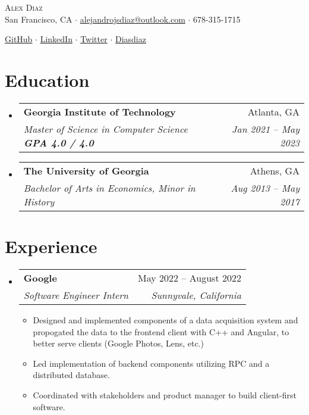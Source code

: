 \documentclass[12pt, letter]{article}
\makeatletter
\newcommand{\resumeItem}[1]{
  \item\small{
    {#1 \vspace{-2pt}}
  }
}
\newcommand{\resumeSubheading}[4]{
  \vspace{-2pt}\item
    \begin{tabular*}{0.97\textwidth}[t]{l@{\extracolsep{\fill}}r}
      \textbf{#1} & #2 \\
      \textit{\small#3} & \textit{\small #4} \\
    \end{tabular*}\vspace{-7pt}
}
\newcommand{\resumeSubHeadingListStart}{\begin{itemize}[leftmargin=0.15in, label={}]}
\newcommand{\resumeSubHeadingListEnd}{\end{itemize}}
\newcommand{\resumeItemListStart}{\begin{itemize}[noitemsep]} %
\newcommand{\resumeItemListEnd}{\end{itemize}\vspace{-16pt}}
\makeatother
\begin{document}
    

\vspace*{-14pt}
\begin{center}
	{\Huge \scshape {Alex Diaz}}\\
	\vspace{1mm}
	\faMapMarker \hspace{.5mm} San Francisco, CA $\cdot$ 
	\faEnvelope \hspace{.5mm} \href{mailto:alejandrojsdiaz@outlook.com}{alejandrojsdiaz@outlook.com} $\cdot$ \faMobile \hspace{.5mm} 678-315-1715
		
	\faGithub \hspace{.5mm} \href{https://github.com/calmcoconut}{GitHub} $\cdot$
	\faLinkedin \hspace{.5mm} \href{https://www.linkedin.com/in/diazjalejandro/}{LinkedIn} $\cdot$
	\faTwitter \hspace{.5mm} \href{https://twitter.com/greetingsfriend}{Twitter} $\cdot$
    \faBriefcase \hspace{.5mm} \href{https://calmcoconut.github.io/diasDiaz/}{Diasdiaz}
    \\
\end{center}

\vspace{-14pt}
\section{Education}
  \resumeSubHeadingListStart
    \resumeSubheading
      {Georgia Institute of Technology}{Atlanta, GA}
      {Master of Science in Computer Science \textbf{GPA 4.0 / 4.0}}{Jan 2021 -- May 2023}
    \resumeSubheading
      {The University of Georgia}{Athens, GA}
      {Bachelor of Arts in Economics, Minor in History}{Aug 2013 -- May 2017}
 \resumeSubHeadingListEnd


\section{Experience}

\resumeSubHeadingListStart
  \resumeSubheading
    {Google}{May 2022 -- August 2022}
    {Software Engineer Intern}{Sunnyvale, California}
    \resumeItemListStart
      \resumeItem{Designed and implemented components of a data acquisition system and propogated the data to the frontend client with C++ and Angular, to better serve clients (Google Photos, Lens, etc.)}
      \resumeItem{Led implementation of backend components utilizing RPC and a distributed database.}
      \resumeItem{Coordinated with stakeholders and product manager to build client-first software.}
    \resumeItemListEnd
    \resumeSubHeadingListEnd
\end{document}
